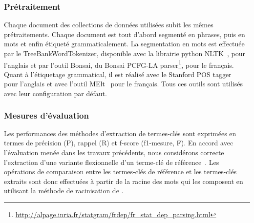       \subsubsection{Prétraitement}
      \label{subsubsec:main-automatic_keyphrase_annotation-unsupervised_automatic_keyphrase_extraction-evaluation-preprocessing}
        Chaque document des collections de données utilisées subit les mêmes
        prétraitements. Chaque document est tout d'abord segmenté en phrases,
        puis en mots et enfin étiqueté grammaticalement. La segmentation en mots
        est effectuée par le TreeBankWordTokenizer, disponible avec la librairie
        python NLTK~\cite[\textit{Natural Language ToolKit}]{bird2009nltk}, pour
        l'anglais et par l'outil Bonsai, du Bonsai PCFG-LA
        parser\footnote{\url{http://alpage.inria.fr/statgram/frdep/fr_stat_dep_parsing.html}},
        pour le français. Quant à l'étiquetage grammatical, il est réalisé avec
        le Stanford POS tagger~\cite{toutanova2003stanfordpostagger} pour
        l'anglais et avec l'outil MElt~\cite{denis2009melt} pour le français.
        Tous ces outils sont utilisés avec leur configuration par défaut.

      \subsubsection{Mesures d'évaluation}
      \label{subsubsec:main-automatic_keyphrase_annotation-unsupervised_automatic_keyphrase_extraction-evaluation-evaluation_measures}
        Les performances des méthodes d'extraction de termes-clés sont exprimées
        en termes de précision (P), rappel (R) et f-score (f1-mesure, F). En
        accord avec l'évaluation menée dans les travaux précédents, nous
        considérons correcte l'extraction d'une variante flexionnelle d'un
        terme-clé de référence~\cite{kim2010semeval}. Les opérations de
        comparaison entre les termes-clés de référence et les termes-clés
        extraits sont donc effectuées à partir de la racine des mots qui les
        composent en utilisant la méthode de racinisation de
        .

